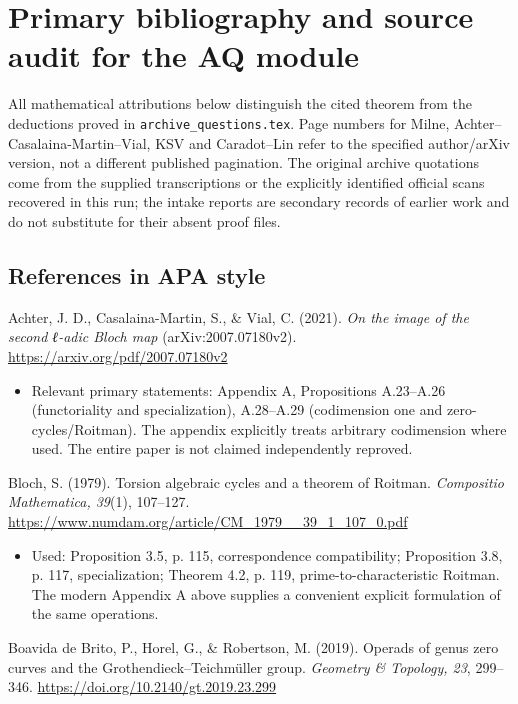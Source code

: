 \documentclass[11pt,a4paper]{article}
\providecommand{\tightlist}{\setlength{\itemsep}{0pt}\setlength{\parskip}{0pt}}
\theoremstyle{definition}\newtheorem{definition}[theorem]{Definition}
\theoremstyle{remark}\newtheorem{remark}[theorem]{Remark}
\begin{document}
\section{Primary bibliography and source audit for the AQ
module}\label{primary-bibliography-and-source-audit-for-the-aq-module}

All mathematical attributions below distinguish the cited theorem from
the deductions proved in \nolinkurl{archive_questions.tex}. Page numbers
for Milne, Achter--Casalaina-Martin--Vial, KSV and Caradot--Lin refer to
the specified author/arXiv version, not a different published
pagination. The original archive quotations come from the supplied
transcriptions or the explicitly identified official scans recovered in
this run; the intake reports are secondary records of earlier work and
do not substitute for their absent proof files.

\subsection{References in APA style}\label{references-in-apa-style}

Achter, J. D., Casalaina-Martin, S., \& Vial, C. (2021). \emph{On the
image of the second ℓ-adic Bloch map} (arXiv:2007.07180v2).
\url{https://arxiv.org/pdf/2007.07180v2}

\begin{itemize}
\tightlist
\item
  Relevant primary statements: Appendix A, Propositions A.23--A.26
  (functoriality and specialization), A.28--A.29 (codimension one and
  zero-cycles/Roitman). The appendix explicitly treats arbitrary
  codimension where used. The entire paper is not claimed independently
  reproved.
\end{itemize}

Bloch, S. (1979). Torsion algebraic cycles and a theorem of Roitman.
\emph{Compositio Mathematica, 39}(1), 107--127.
\url{https://www.numdam.org/article/CM_1979__39_1_107_0.pdf}

\begin{itemize}
\tightlist
\item
  Used: Proposition 3.5, p. 115, correspondence compatibility;
  Proposition 3.8, p. 117, specialization; Theorem 4.2, p. 119,
  prime-to-characteristic Roitman. The modern Appendix A above supplies
  a convenient explicit formulation of the same operations.
\end{itemize}

Boavida de Brito, P., Horel, G., \& Robertson, M. (2019). Operads of
genus zero curves and the Grothendieck--Teichmüller group.
\emph{Geometry \& Topology, 23}, 299--346.
\url{https://doi.org/10.2140/gt.2019.23.299}
\end{document}
